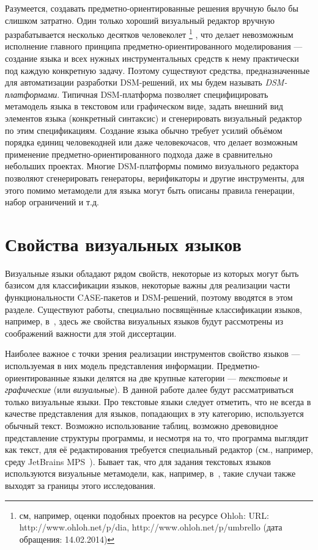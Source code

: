 Разумеется, создавать предметно-ориентированные решения вручную было бы слишком 
затратно. Один только хороший визуальный редактор вручную разрабатывается 
несколько десятков человеколет%
\footnote{см, например, оценки подобных проектов на ресурсе Ohloh: 
URL: http://www.ohloh.net/p/dia, http://www.ohloh.net/p/umbrello (дата обращения: 14.02.2014)}%
, что делает невозможным исполнение главного 
принципа предметно-ориентированного моделирования --- создание языка и всех 
нужных инструментальных средств к нему практически под каждую конкретную задачу. 
Поэтому существуют средства, предназначенные для автоматизации разработки 
DSM-решений, их мы будем называть \textit{DSM-платформами}. 
Типичная DSM-платформа позволяет специфицировать метамодель языка в текстовом или графическом виде, задать 
внешний вид элементов языка (конкретный синтаксис) и сгенерировать визуальный 
редактор по этим спецификациям. Создание языка обычно требует усилий объёмом 
порядка единиц человекодней или даже человекочасов, что делает возможным 
применение предметно-ориентированного подхода даже в сравнительно небольших 
проектах. Многие DSM-платформы помимо визуального редактора позволяют 
сгенерировать генераторы, верификаторы и другие инструменты, для этого помимо 
метамодели для языка могут быть описаны правила генерации, набор ограничений 
и т.д.

\section{Свойства визуальных языков}
Визуальные языки обладают рядом свойств, некоторые из которых могут быть базисом 
для классификации языков, некоторые важны для реализации части функциональности \ac{CASE}-пакетов 
и \ac{DSM}-решений, поэтому вводятся в этом разделе. Существуют работы, специально
посвящённые классификации языков, например, в~\cite{costagliola2002classification},
здесь же свойства визуальных языков будут рассмотрены из соображений важности для этой диссертации.

Наиболее важное с точки зрения реализации инструментов свойство языков --- 
используемая в них модель представления информации. Предметно-ориентированные 
языки делятся на две крупные категории --- \textit{текстовые} и \textit{графические} 
(или \textit{визуальные}). В данной работе далее будут рассматриваться только визуальные 
языки. Про текстовые языки следует отметить, что не всегда в качестве представления для языков, 
попадающих в эту категорию, используется обычный текст. Возможно использование таблиц, 
возможно древовидное представление структуры программы, и несмотря на то, что программа 
выглядит как текст, для её редактирования требуется специальный редактор (см., например, среду 
JetBrains MPS~\cite{dmitriev2004language}). Бывает так, что для задания текстовых языков используются визуальные метамодели,
как, например, в~\cite{karlsch2007model}, такие случаи также выходят за границы этого исследования.

